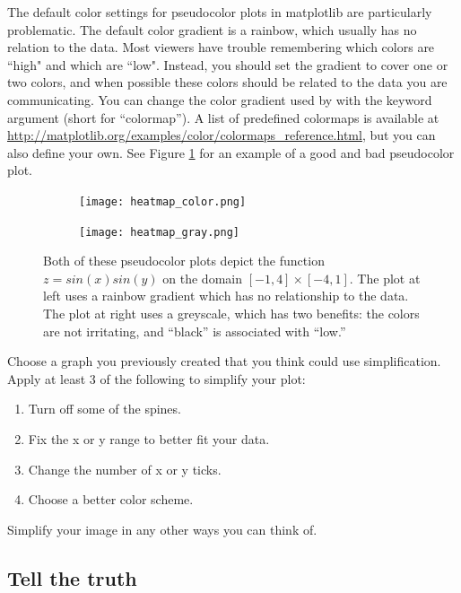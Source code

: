 The default color settings for pseudocolor plots in matplotlib are particularly problematic. 
The default color gradient is a rainbow, which usually has no relation to the data. 
Most viewers have trouble remembering which colors are ``high" and which are ``low". 
Instead, you should set the gradient to cover one or two colors, and when possible these colors should be related to the data you are communicating. 
You can change the color gradient used by  with the keyword argument  (short for ``colormap''). 
A list of predefined colormaps is available at \url{http://matplotlib.org/examples/color/colormaps_reference.html}, but you can also define your own. 
See Figure \ref{fig:heatmap} for an example of a good and bad pseudocolor plot.


\begin{figure}
\centering
\begin{subfigure}{.5\textwidth}
  \centering
  \texttt{[image: heatmap\_color.png]}
\end{subfigure}%
\begin{subfigure}{.5\textwidth}
  \centering
  \texttt{[image: heatmap\_gray.png]}
\end{subfigure}
\caption{Both of these pseudocolor plots depict the function $z = sin(x)sin(y)$ on the domain $[-1,4] \times [-4,1]$. 
The plot at left uses a rainbow gradient which has no relationship to the data. 
The plot at right uses a greyscale, which has two benefits: the colors are not irritating, and ``black'' is associated with ``low.''}
\label{fig:heatmap}
\end{figure}

\begin{problem}
Choose a graph you previously created that you think could use simplification. 
Apply at least 3 of the following to simplify your plot:
\begin{enumerate}
\item Turn off some of the spines.
\item Fix the x or y range to better fit your data.
\item Change the number of x or y ticks.
\item Choose a better color scheme.
\end{enumerate}
Simplify your image in any other ways you can think of.
\end{problem}

\subsection*{Tell the truth}

